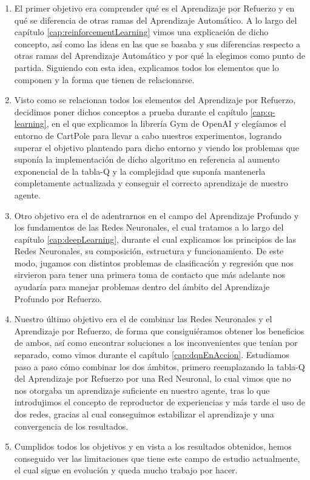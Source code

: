 \begin{enumerate}
        \item El primer objetivo era comprender qué es el Aprendizaje por Refuerzo y en qué se diferencia de otras ramas del Aprendizaje Automático. A lo largo del capítulo \ref{cap:reinforcementLearning} vimos una explicación de dicho concepto, así como las ideas en las que se basaba y sus diferencias respecto a otras ramas del Aprendizaje Automático y por qué la elegimos como punto de partida. Siguiendo con esta idea, explicamos todos los elementos que lo componen y la forma que tienen de relacionarse.
        \item Visto como se relacionan todos los elementos del Aprendizaje por Refuerzo, decidimos poner dichos conceptos a prueba durante el capítulo \ref{cap:q-learning}, en el que explicamos la librería Gym de OpenAI y elegíamos el entorno de CartPole para llevar a cabo nuestros experimentos, logrando superar el objetivo planteado para dicho entorno y viendo los problemas que suponía la implementación de dicho algoritmo en referencia al aumento exponencial de la tabla-Q y la complejidad que suponía mantenerla completamente actualizada y conseguir el correcto aprendizaje de nuestro agente.
        \item Otro objetivo era el de adentrarnos en el campo del Aprendizaje Profundo y los fundamentos de las Redes Neuronales, el cual tratamos a lo largo del capítulo \ref{cap:deepLearning}, durante el cual explicamos los principios de las Redes Neuronales, su composición, estructura y funcionamiento. De este modo, jugamos con distintos problemas de clasificación y regresión que nos sirvieron para tener una primera toma de contacto que más adelante nos ayudaría para manejar problemas dentro del ámbito del Aprendizaje Profundo por Refuerzo.
        \item Nuestro último objetivo era el de combinar las Redes Neuronales y el Aprendizaje por Refuerzo, de forma que consiguiéramos obtener los beneficios de ambos, así como encontrar soluciones a los inconvenientes que tenían por separado, como vimos durante el capítulo \ref{cap:dqnEnAccion}. Estudiamos paso a paso cómo combinar los dos ámbitos, primero reemplazando la tabla-Q del Aprendizaje por Refuerzo por una Red Neuronal, lo cual vimos que no nos otorgaba un aprendizaje suficiente en nuestro agente, tras lo que introdujimos el concepto de reproductor de experiencias y más tarde el uso de dos redes, gracias al cual conseguimos estabilizar el aprendizaje y una convergencia de los resultados.
        \item Cumplidos todos los objetivos y en vista a los resultados obtenidos, hemos conseguido ver las limitaciones que tiene este campo de estudio actualmente, el cual sigue en evolución y queda mucho trabajo por hacer.
\end{enumerate}

